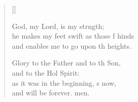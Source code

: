 \begin{verse}[\versewidth]
\begin{patverse}
God, my Lord, is my strngth;\Flex\\
he makes my feet swift as those f hinds\Med\\
and enables me to go upon th heights.

Glory to the Father and to th Son,\Med\\
and to the Hol Spirit:\\
as it was in the beginning, \pointup{\i}s now,\Med\\
and will be forever. men. 
  \end{patverse}
\end{verse}
